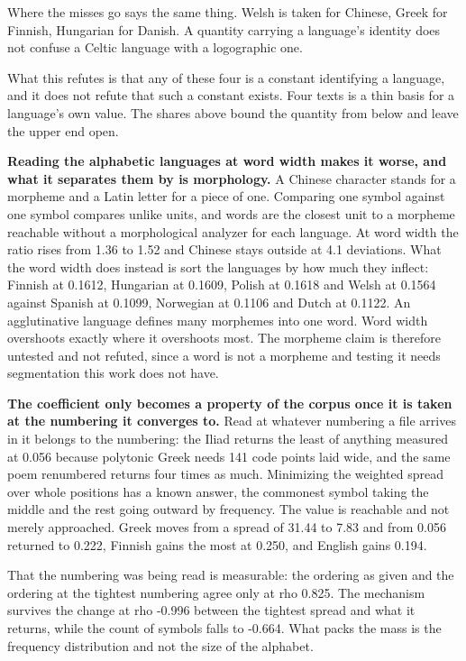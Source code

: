 Where the misses go says the same thing. Welsh is taken for Chinese, Greek for Finnish, Hungarian for Danish. A quantity carrying a language's identity does not confuse a Celtic language with a logographic one.

What this refutes is that any of these four is a constant identifying a language, and it does not refute that such a constant exists. Four texts is a thin basis for a language's own value. The shares above bound the quantity from below and leave the upper end open.

\textbf{Reading the alphabetic languages at word width makes it worse, and what it separates them by is morphology.} A Chinese character stands for a morpheme and a Latin letter for a piece of one. Comparing one symbol against one symbol compares unlike units, and words are the closest unit to a morpheme reachable without a morphological analyzer for each language. At word width the ratio rises from 1.36 to 1.52 and Chinese stays outside at 4.1 deviations. What the word width does instead is sort the languages by how much they inflect: Finnish at 0.1612, Hungarian at 0.1609, Polish at 0.1618 and Welsh at 0.1564 against Spanish at 0.1099, Norwegian at 0.1106 and Dutch at 0.1122. An agglutinative language defines many morphemes into one word. Word width overshoots exactly where it overshoots most. The morpheme claim is therefore untested and not refuted, since a word is not a morpheme and testing it needs segmentation this work does not have.

\textbf{The coefficient only becomes a property of the corpus once it is taken at the numbering it converges to.} Read at whatever numbering a file arrives in it belongs to the numbering: the Iliad returns the least of anything measured at 0.056 because polytonic Greek needs 141 code points laid wide, and the same poem renumbered returns four times as much. Minimizing the weighted spread over whole positions has a known answer, the commonest symbol taking the middle and the rest going outward by frequency. The value is reachable and not merely approached. Greek moves from a spread of 31.44 to 7.83 and from 0.056 returned to 0.222, Finnish gains the most at 0.250, and English gains 0.194.

That the numbering was being read is measurable: the ordering as given and the ordering at the tightest numbering agree only at rho 0.825. The mechanism survives the change at rho -0.996 between the tightest spread and what it returns, while the count of symbols falls to -0.664. What packs the mass is the frequency distribution and not the size of the alphabet.

